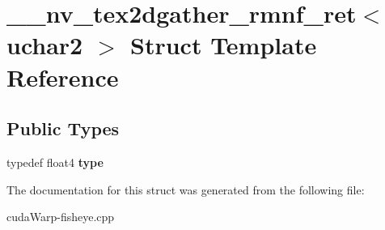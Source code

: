 \hypertarget{struct____nv__tex2dgather__rmnf__ret_3_01uchar2_01_4}{}\section{\+\_\+\+\_\+nv\+\_\+tex2dgather\+\_\+rmnf\+\_\+ret$<$ uchar2 $>$ Struct Template Reference}
\label{struct____nv__tex2dgather__rmnf__ret_3_01uchar2_01_4}
\subsection*{Public Types}
\begin{DoxyCompactItemize}
\item 
typedef float4 {\bfseries type}\hypertarget{struct____nv__tex2dgather__rmnf__ret_3_01uchar2_01_4_a71bd6e55073034822db69ac319ac5e74}{}\label{struct____nv__tex2dgather__rmnf__ret_3_01uchar2_01_4_a71bd6e55073034822db69ac319ac5e74}

\end{DoxyCompactItemize}


The documentation for this struct was generated from the following file\+:\begin{DoxyCompactItemize}
\item 
cuda\+Warp-\/fisheye.\+cpp\end{DoxyCompactItemize}
